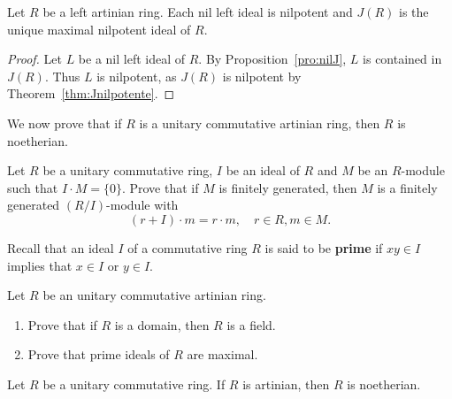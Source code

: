 \begin{corollary}
	Let $R$ be a left artinian ring. Each nil left ideal is nilpotent and 
	$J(R)$ is the unique maximal nilpotent ideal of $R$. 
\end{corollary}

\begin{proof}
	Let $L$ be a nil left ideal of $R$. By Proposition~\ref{pro:nilJ}, $L$
	is contained in $J(R)$. Thus $L$ is nilpotent, as $J(R)$ 
	is nilpotent by Theorem~\ref{thm:Jnilpotente}. 
\end{proof}


We now prove that 
if $R$ is a unitary commutative artinian ring, 
then $R$ is noetherian. 

\begin{exercise}
\label{xca:I_fg}
    Let $R$ be a unitary commutative ring, $I$ be an ideal of $R$
    and $M$ be an $R$-module such that $I\cdot M=\{0\}$. Prove that
    if $M$ is finitely generated, then $M$ is a finitely generated
    $(R/I)$-module with
    \[
    (r+I)\cdot m=r\cdot m,\quad r\in R,m\in M.
    \]
\end{exercise}

Recall that an ideal $I$  
of a commutative ring 
$R$ is said to be \textbf{prime} if 
$xy\in I$ implies that $x\in I$ or $y\in I$. 

\begin{exercise}
    Let $R$ be an unitary commutative artinian ring. 
    \begin{enumerate}
        \item Prove that if $R$ is a domain, then $R$ is a field. 
        \item Prove that prime ideals of $R$ are maximal. 
    \end{enumerate}
\end{exercise}


\begin{theorem}[Akizuki]
    Let $R$ be a unitary commutative ring. If $R$ is artinian, 
    then $R$ is noetherian.
\end{theorem}


